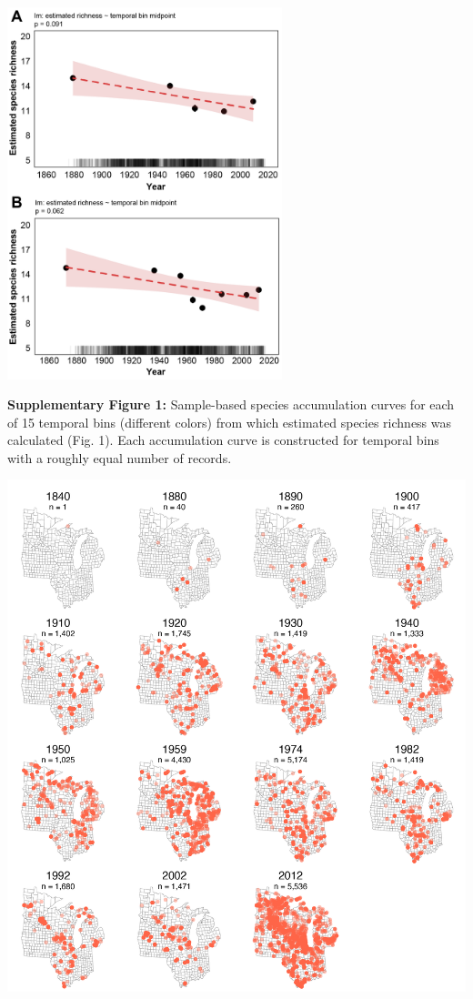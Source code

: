 \documentclass[11pt,]{article}
\begin{document}
\clearpage

\newpage

\includegraphics[width=0.6\textwidth,height=\textheight]{../ms_figs/fig_s1.png}

\textbf{Supplementary Figure 1:} Sample-based species accumulation
curves for each of 15 temporal bins (different colors) from which
estimated species richness was calculated (Fig. 1). Each accumulation
curve is constructed for temporal bins with a roughly equal number of
records.

\clearpage

\newpage

\includegraphics[width=1\textwidth,height=\textheight]{../ms_figs/fig_s2.png}
\end{document}
